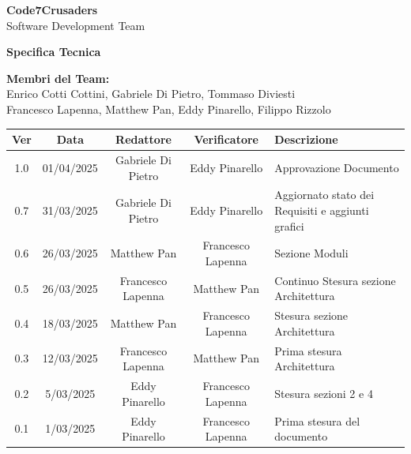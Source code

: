 \documentclass{article}
\begin{document}
\begin{titlepage}
    {\Huge \textbf{Code7Crusaders}}\\
    \vspace{0.5cm}
    {\Large Software Development Team}\\
    \vspace{2cm}
    
    \large \textbf{Specifica Tecnica}
    \vspace{3.9cm}

    \textbf{Membri del Team:}\\
    Enrico Cotti Cottini, Gabriele Di Pietro, Tommaso Diviesti \\
    Francesco Lapenna, Matthew Pan, Eddy Pinarello, Filippo Rizzolo \\
    \vspace{0.5cm}
    
    \vspace{1cm}
\end{titlepage}



\newpage
\begin{table}[h]
    \centering
    \renewcommand{\arraystretch}{1.2}
    \setlength{\tabcolsep}{5pt}
    \begin{tabular}{|c|c|c|c|m{}|}
        \hline
        \textbf{Ver} & \textbf{Data} & \textbf{Redattore} & \textbf{Verificatore} & \textbf{Descrizione} \\
        \hline
        1.0 & 01/04/2025 & Gabriele Di Pietro & Eddy Pinarello & Approvazione Documento\\
        \hline
        0.7 & 31/03/2025 & Gabriele Di Pietro & Eddy Pinarello & Aggiornato stato dei Requisiti e aggiunti grafici \\
        \hline
        0.6 & 26/03/2025 & Matthew Pan & Francesco Lapenna & Sezione Moduli\\
        \hline
        0.5 & 26/03/2025 & Francesco Lapenna & Matthew Pan & Continuo Stesura sezione Architettura\\
        \hline
        0.4 & 18/03/2025 & Matthew Pan & Francesco Lapenna & Stesura sezione Architettura\\
        \hline
        0.3 & 12/03/2025 & Francesco Lapenna & Matthew Pan & Prima stesura Architettura \\
        \hline
        0.2 & 5/03/2025 & Eddy Pinarello & Francesco Lapenna & Stesura sezioni 2 e 4 \\
        \hline
        0.1 & 1/03/2025 & Eddy Pinarello & Francesco Lapenna & Prima stesura del documento \\
        \hline
    \end{tabular}
\end{table}


\newpage
\tableofcontents
\listoftables
\listoffigures

\newpage



\newpage



\newpage



\newpage


\end{document}
